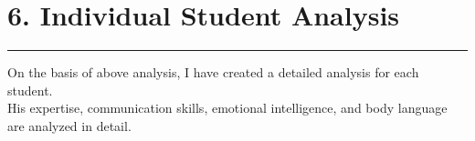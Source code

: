 \documentclass{article}
\begin{document}





\section{6. Individual Student Analysis}
  \begin{center}
        \color{red}\rule{1\linewidth}{1mm}
    \end{center}

On the basis of above analysis, I have created a detailed analysis for each student.\\
His expertise, communication skills, emotional intelligence, and body language are analyzed in detail.\\
\end{document}
